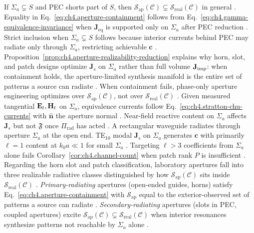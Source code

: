 If \(\Sigma_{a}\subsetneq S\) and PEC shorts part of \(S\), then
\(\mathcal{S}_{\mathrm{ap}}(\mathcal{C})\subsetneq\mathcal{S}_{\mathrm{real}}(\mathcal{C})\) in general
\cite{collin2001}.
Equality in Eq.~\eqref{eq:ch4.aperture-containment} follows from
Eq.~\eqref{eq:ch4.gamma-equivalence-invariance} when \(\mathbf{J}_{\mathrm{eq}}\) is supported only on
\(\Sigma_{a}\) after PEC reduction \cite{stratton1941}. Strict inclusion when \(\Sigma_{a}\subsetneq S\) follows
because interior currents behind PEC may radiate only through \(\Sigma_{a}\), restricting achievable \(\mathbf{c}\)
\cite{collin2001}.
Proposition~\ref{prop:ch4.aperture-realizability-reduction} explains why horn, slot, and patch designs optimize
\(\mathbf{J}_{s}\) on \(\Sigma_{a}\) rather than full volume \(\mathbf{J}_{\mathrm{imp}}\): when containment holds, the aperture-limited synthesis manifold is the entire set of patterns a source can radiate \cite{harrington2001}. When containment fails, phase-only
aperture engineering optimizes over \(\mathcal{S}_{\mathrm{ap}}(\mathcal{C})\), not over
\(\mathcal{S}_{\mathrm{real}}(\mathcal{C})\) \cite{devaney2004}.
Given measured tangential \(\mathbf{E}_{t},\mathbf{H}_{t}\) on \(\Sigma_{a}\), equivalence currents follow
Eq.~\eqref{eq:ch4.stratton-chu-currents} with \(\hat{\mathbf{n}}\) the aperture normal
\cite{stratton1941}. Near-field reactive content on \(\Sigma_{a}\) affects \(\mathbf{J}_{s}\) but not
\(\mathfrak{F}\) once \(\Pi_{\mathrm{rad}}\) has acted \cite{stratton1941}.
A rectangular waveguide radiates through aperture \(\Sigma_{a}\) at the open end. TE\(_{10}\) modal \(\mathbf{J}_{s}\)
on \(\Sigma_{a}\) generates \(\mathbf{c}\) with primarily \(\ell=1\) content at \(k_{0}a\ll1\) for small
\(\Sigma_{a}\) \cite{collin2001}. Targeting \(\ell>3\) coefficients from \(\Sigma_{a}\) alone fails
Corollary~\ref{cor:ch4.channel-count} when patch rank \(P\) is insufficient \cite{hansen1988}.
Regarding the horn slot and patch classification, laboratory apertures fall into three realizable radiative classes distinguished by how \(\mathcal{S}_{\mathrm{ap}}(\mathcal{C})\)
sits inside \(\mathcal{S}_{\mathrm{real}}(\mathcal{C})\) \cite{collin2001}. \emph{Primary-radiating}
apertures (open-ended guides, horns) satisfy Eq.~\eqref{eq:ch4.aperture-containment} with \(\mathcal{S}_{\mathrm{ap}}\)
equal to the exterior-observed set of patterns a source can radiate \cite{stratton1941}. \emph{Secondary-radiating} apertures (slots in PEC,
coupled apertures) excite \(\mathcal{S}_{\mathrm{ap}}(\mathcal{C})\subsetneq\mathcal{S}_{\mathrm{real}}(\mathcal{C})\) when
interior resonances synthesize patterns not reachable by \(\Sigma_{a}\) alone \cite{harrington2001}.
